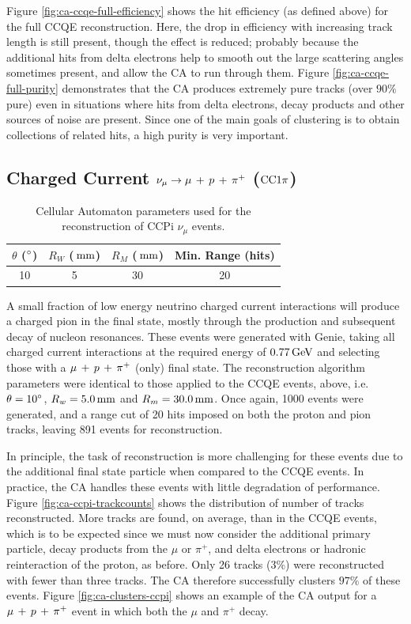 Figure \ref{fig:ca-ccqe-full-efficiency} shows the hit efficiency (as defined above) for the full CCQE reconstruction. Here, the drop in efficiency with increasing track length is still present, though the effect is reduced; probably because the additional hits from delta electrons help to smooth out the large scattering angles sometimes present, and allow the \ac{CA} to run through them. Figure \ref{fig:ca-ccqe-full-purity} demonstrates that the \ac{CA} produces extremely pure tracks (over $90\%$ pure) even in situations where hits from delta electrons, decay products and other sources of noise are present. Since one of the main goals of clustering is to obtain collections of related hits, a high purity is very important.

\subsection{Charged Current $\nu_\mu \rightarrow \mu\,+\,p\,+\,\pi^{+}$ ($\mathrm{CC}1\pi$)}
\begin{table}[h]
    \centering
    \begin{tabular}{cccc}
        $\theta$ ($^\circ$) & $R_W$ ($\,\mathrm{mm}$) & $R_M$ ($\,\mathrm{mm}$) & Min. Range (hits) \\
        \hline
        \hline
        10 & 5 & 30 & 20 \\
        \hline
    \end{tabular}
    \caption[CA parameter set for reconstruction of \acs{CCPi} events]{\label{table:ca_params_ccpi}Cellular Automaton parameters used for the reconstruction of \acs{CCPi} $\nu_\mu$ events.}
\end{table}

A small fraction of low energy neutrino charged current interactions will produce a charged pion in the final state, mostly through the production and subsequent decay of nucleon resonances. These events were generated with Genie, taking all charged current interactions at the required energy of $0.77\,\mathrm{GeV}$ and selecting those with a $\mu\,+\,p\,+\,\pi^{+}$ (only) final state. The reconstruction algorithm parameters were identical to those applied to the \ac{CCQE} events, above, i.e. $\theta=10^\circ$, $R_w=5.0\,\mathrm{mm}$ and $R_m=30.0\,\mathrm{mm}$. Once again, 1000 events were generated, and a range cut of 20 hits imposed on both the proton and pion tracks, leaving 891 events for reconstruction.

In principle, the task of reconstruction is more challenging for these events due to the additional final state particle when compared to the CCQE events. In practice, the \ac{CA} handles these events with little degradation of performance. Figure \ref{fig:ca-ccpi-trackcounts} shows the distribution of number of tracks reconstructed. More tracks are found, on average, than in the CCQE events, which is to be expected since we must now consider the additional primary particle, decay products from the $\mu$ or $\pi^+$, and delta electrons or hadronic reinteraction of the proton, as before. Only 26 tracks ($3\%$) were reconstructed with fewer than three tracks. The \ac{CA} therefore successfully clusters $97\%$ of these events. Figure \ref{fig:ca-clusters-ccpi} shows an example of the CA output for a $\mu\,+\,p\,+\,\pi^{+}$ event in which both the $\mu$ and $\pi^+$ decay.

